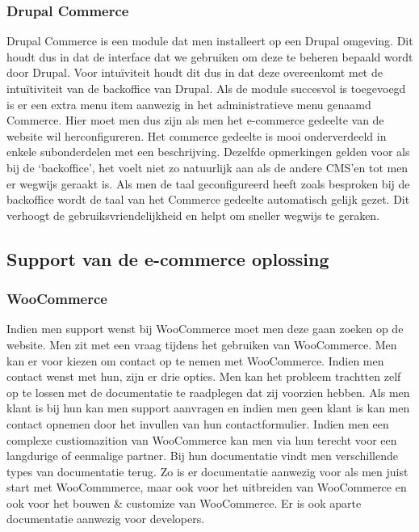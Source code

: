 \subsubsection{Drupal Commerce}
Drupal Commerce is een module dat men installeert op een Drupal omgeving. Dit houdt dus in dat de interface dat we gebruiken om deze te beheren bepaald wordt door Drupal. Voor intuïviteit houdt dit dus in dat deze overeenkomt met de intuïtiviteit van de backoffice van Drupal. Als de module succesvol is toegevoegd is er een extra menu item aanwezig in het administratieve menu genaamd Commerce. Hier moet men dus zijn als men het e-commerce gedeelte van de website wil herconfigureren. Het commerce gedeelte is mooi onderverdeeld in enkele subonderdelen met een beschrijving. Dezelfde opmerkingen gelden voor als bij de `backoffice', het voelt niet zo natuurlijk aan als de andere CMS'en tot men er wegwijs geraakt is. Als men de taal geconfigureerd heeft zoals besproken bij de backoffice wordt de taal van het Commerce gedeelte automatisch gelijk gezet. Dit verhoogt de gebruiksvriendelijkheid en helpt om sneller wegwijs te geraken.
\subsection{Support van de e-commerce oplossing}
\subsubsection{WooCommerce}
Indien men support wenst bij WooCommerce moet men deze gaan zoeken op de website. Men zit met een vraag tijdens het gebruiken van WooCommerce. Men kan er voor kiezen om contact op te nemen met WooCommerce. Indien men contact wenst met hun, zijn er drie opties. Men kan het probleem trachtten zelf op te lossen met de documentatie te raadplegen dat zij voorzien hebben. Als men klant is bij hun kan men support aanvragen en indien men geen klant is kan men contact opnemen door het invullen van hun contactformulier. Indien men een complexe custiomazition van WooCommerce kan men via hun terecht voor een langdurige of eenmalige partner. Bij hun documentatie vindt men verschillende types van documentatie terug. Zo is er documentatie aanwezig voor als men juist start met WooCommmerce, maar ook voor het uitbreiden van WooCommerce en ook voor het bouwen \& customize van WooCommerce. Er is ook aparte documentatie aanwezig voor developers.
